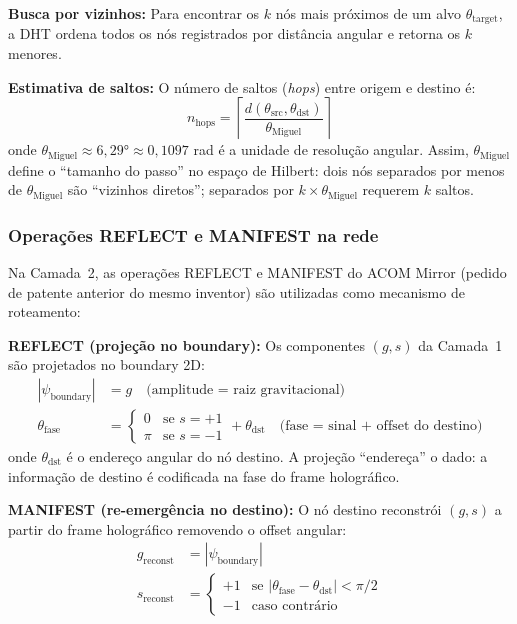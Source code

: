 \documentclass[12pt,a4paper]{article}
\newcommand{\thetaM}{\theta_{\text{Miguel}}}
\begin{document}
\textbf{Busca por vizinhos:} Para encontrar os $k$ nós mais
próximos de um alvo $\theta_{\text{target}}$, a DHT ordena
todos os nós registrados por distância angular e retorna os
$k$ menores.

\textbf{Estimativa de saltos:} O número de saltos
(\textit{hops}) entre origem e destino é:
\begin{equation}
n_{\text{hops}} = \left\lceil
  \frac{d(\theta_{\text{src}}, \theta_{\text{dst}})}{\thetaM}
\right\rceil
\label{eq:hops}
\end{equation}
onde $\thetaM \approx 6{,}29° \approx 0{,}1097$ rad é a unidade
de resolução angular. Assim, $\thetaM$ define o ``tamanho do
passo'' no espaço de Hilbert: dois nós separados por menos de
$\thetaM$ são ``vizinhos diretos''; separados por $k \times
\thetaM$ requerem $k$ saltos.

\subsubsection{Operações REFLECT e MANIFEST na rede}

Na Camada~2, as operações REFLECT e MANIFEST do ACOM Mirror
(pedido de patente anterior do mesmo inventor) são utilizadas
como mecanismo de roteamento:

\textbf{REFLECT (projeção no boundary):} Os componentes $(g, s)$
da Camada~1 são projetados no boundary 2D:
\begin{align}
|\psi_{\text{boundary}}| &= g
  \quad \text{(amplitude = raiz gravitacional)} \\
\theta_{\text{fase}} &= \begin{cases}
  0 & \text{se } s = +1 \\
  \pi & \text{se } s = -1
\end{cases} + \theta_{\text{dst}}
  \quad \text{(fase = sinal + offset do destino)}
\end{align}
onde $\theta_{\text{dst}}$ é o endereço angular do nó destino.
A projeção ``endereça'' o dado: a informação de destino é
codificada na fase do frame holográfico.

\textbf{MANIFEST (re-emergência no destino):} O nó destino
reconstrói $(g, s)$ a partir do frame holográfico removendo
o offset angular:
\begin{align}
g_{\text{reconst}} &= |\psi_{\text{boundary}}| \\
s_{\text{reconst}} &= \begin{cases}
  +1 & \text{se } |\theta_{\text{fase}} - \theta_{\text{dst}}|
    < \pi/2 \\
  -1 & \text{caso contrário}
\end{cases}
\end{align}
\end{document}
